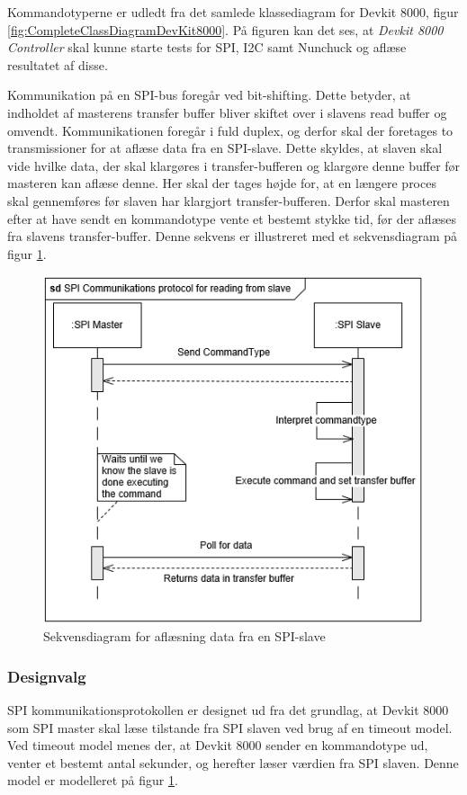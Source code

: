 \noindent Kommandotyperne er udledt fra det samlede klassediagram for Devkit 8000, figur \ref{fig:CompleteClassDiagramDevKit8000}. På figuren kan det ses, at \textit{Devkit 8000 Controller} skal kunne starte tests for SPI, I2C samt Nunchuck og aflæse resultatet af disse. \newline

\noindent Kommunikation på en SPI-bus foregår ved bit-shifting. Dette betyder, at indholdet af masterens transfer buffer bliver skiftet over i slavens read buffer og omvendt. Kommunikationen foregår i fuld duplex, og derfor skal der foretages to transmissioner for at aflæse data fra en SPI-slave. Dette skyldes, at slaven skal vide hvilke data, der skal klargøres i transfer-bufferen og klargøre denne buffer før masteren kan aflæse denne. Her skal der tages højde for, at en længere proces skal gennemføres før slaven har klargjort transfer-bufferen. Derfor skal masteren efter at have sendt en kommandotype vente et bestemt stykke tid, før der aflæses fra slavens transfer-buffer. Denne sekvens er illustreret med et sekvensdiagram på figur \ref{figure:SDSpiSlaveRead}.

\begin{figure}[H]
	\centering
	\includegraphics[]{Systemarkitektur/images/SDSpiSlaveRead}
	\caption{Sekvensdiagram for aflæsning data fra en SPI-slave}
	\label{figure:SDSpiSlaveRead}
\end{figure} 

\subsubsection{Designvalg}
SPI kommunikationsprotokollen er designet ud fra det grundlag, at Devkit 8000 som SPI master skal læse tilstande fra SPI slaven ved brug af en timeout model. Ved timeout model menes der, at Devkit 8000 sender en kommandotype ud, venter et bestemt antal sekunder, og herefter læser værdien fra SPI slaven. Denne model er modelleret på figur \ref{figure:SDSpiSlaveRead}.\newline

